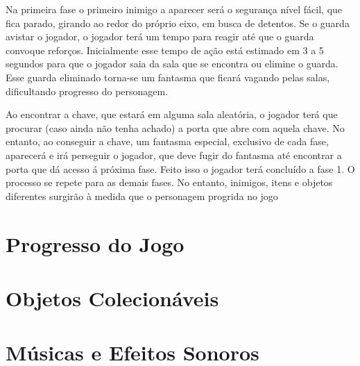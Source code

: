 \documentclass{article}
\begin{document}
    Na primeira fase o primeiro inimigo a aparecer será o segurança nível fácil, que fica parado, girando ao redor do próprio eixo, em busca de detentos. Se o guarda avistar o jogador, o jogador terá um tempo para reagir até que o guarda convoque reforços. Inicialmente esse tempo de ação está estimado em 3 a 5 segundos para que o jogador saia da sala que se encontra ou elimine o guarda. Esse guarda eliminado torna-se um fantasma que ficará vagando pelas salas, dificultando progresso do personagem.
  
    Ao encontrar a chave, que estará em alguma sala aleatória, o jogador terá que procurar (caso ainda não tenha achado) a porta que abre com aquela chave. No entanto, ao conseguir a chave, um fantasma especial, exclusivo de cada fase, aparecerá e irá perseguir o jogador, que deve fugir do fantasma até encontrar a porta que dá acesso á próxima fase. Feito isso o jogador terá concluído a fase 1. O processo se repete para as demais fases. No entanto, inimigos, itens e objetos diferentes surgirão à medida que o personagem progrida no jogo

\section{Progresso do Jogo}
\section{Objetos Colecionáveis}
\section{Músicas e Efeitos Sonoros}
\end{document}
